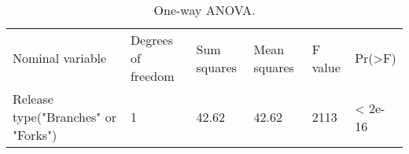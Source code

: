 \begin{table}[H]
\caption{One-way ANOVA.}
\label{table:ch4_rq1_anova} 
\centering
\begin{tabu} to 
  \toprule
  Nominal variable & Degrees of freedom & Sum squares & Mean squares & F value & Pr(>F) \\
  Release type("Branches" or "Forks") & 1 & 42.62 & 42.62 & 2113 & < 2e-16 \\
  \bottomrule
\end{tabu}
\end{table}
